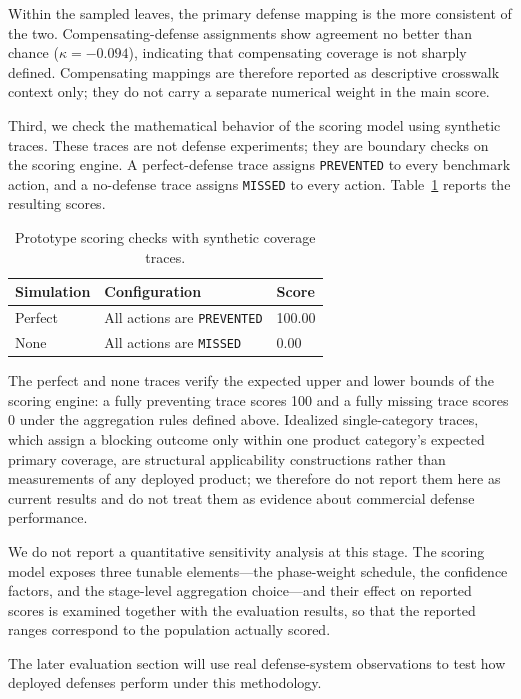 Within the sampled leaves, the primary defense mapping is the more consistent of the two. Compensating-defense assignments show agreement no better than chance ($\kappa=-0.094$), indicating that compensating coverage is not sharply defined. Compensating mappings are therefore reported as descriptive crosswalk context only; they do not carry a separate numerical weight in the main score.

Third, we check the mathematical behavior of the scoring model using synthetic traces. These traces are not defense experiments; they are boundary checks on the scoring engine. A perfect-defense trace assigns \texttt{PREVENTED} to every benchmark action, and a no-defense trace assigns \texttt{MISSED} to every action. Table~\ref{tab:method-coverage-simulation} reports the resulting scores.

\begin{table}[t]
\centering
\caption{Prototype scoring checks with synthetic coverage traces.}
\label{tab:method-coverage-simulation}
\begin{tabular}{p{}p{}p{}}
\hline
Simulation & Configuration & Score \\
\hline
Perfect & All actions are \texttt{PREVENTED} & 100.00 \\
None & All actions are \texttt{MISSED} & 0.00 \\
\hline
\end{tabular}
\end{table}

The perfect and none traces verify the expected upper and lower bounds of the scoring engine: a fully preventing trace scores 100 and a fully missing trace scores 0 under the aggregation rules defined above. Idealized single-category traces, which assign a blocking outcome only within one product category's expected primary coverage, are structural applicability constructions rather than measurements of any deployed product; we therefore do not report them here as current results and do not treat them as evidence about commercial defense performance.

We do not report a quantitative sensitivity analysis at this stage. The scoring model exposes three tunable elements---the phase-weight schedule, the confidence factors, and the stage-level aggregation choice---and their effect on reported scores is examined together with the evaluation results, so that the reported ranges correspond to the population actually scored.

The later evaluation section will use real defense-system observations to test how deployed defenses perform under this methodology.

